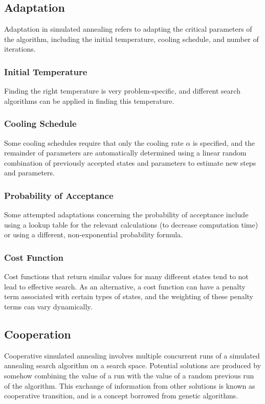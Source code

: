 \documentclass[12pt,titlepage]{article}
\begin{document}
    \subsection{Adaptation}
      Adaptation in simulated annealing refers to adapting the critical parameters of the algorithm, including the initial temperature, cooling schedule, and number of iterations.

      \subsubsection{Initial Temperature}
        Finding the right temperature is very problem-specific, and different search algorithms can be applied in finding this temperature.

      \subsubsection{Cooling Schedule}
        Some cooling schedules require that only the cooling rate $\alpha$ is specified, and the remainder of parameters are automatically determined using a linear random combination
        of previously accepted states and parameters to estimate new steps and parameters.

      \subsubsection{Probability of Acceptance}
        Some attempted adaptations concerning the probability of acceptance include using a lookup table for the relevant calculations (to decrease computation time) or using a different,
        non-exponential probability formula.

      \subsubsection{Cost Function}
        Cost functions that return similar values for many different states tend to not lead to effective search. As an alternative, a cost function can have a penalty term associated with
        certain types of states, and the weighting of these penalty terms can vary dynamically.

    \subsection{Cooperation}
      Cooperative simulated annealing involves multiple concurrent runs of a simulated annealing search algorithm on a search space. Potential solutions are produced by somehow combining
      the value of a run with the value of a random previous run of the algorithm. This exchange of information from other solutions is known as cooperative transition, and is a concept
      borrowed from genetic algorithms.
\end{document}
